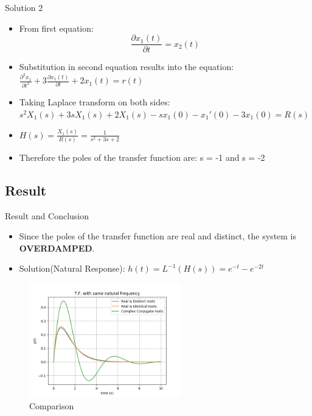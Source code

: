 \documentclass{beamer}
\begin{document}
\begin{frame}{Solution 2}
\begin{block}


\begin{itemize}
\item From first equation: $$\frac{\partial x_1(t)}{\partial t} =              x_2(t) $$
\item Substitution in second equation results into the equation:\vspace{5} $\frac{\partial^2 x_1}{\partial t^2} + 3\frac{\partial x_1(t)}{\partial t} + 2x_1(t) = r(t)$ 
\item Taking Laplace transform on both sides:\vspace{5}
$s^2X_1(s) + 3sX_1(s) + 2X_1(s) - sx_1(0) - x_1'(0) -3x_1(0)  = R(s)$
\item $ H(s) = \frac{X_1(s)}{R(s)} = \frac{1}{s^2 + 3s + 2}$
\item Therefore the poles of the transfer function are: s = -1 and s = -2
\end{itemize}
\end{block}

\end{frame}

\subsection{Result}

\begin{frame}{Result and Conclusion}

\begin{itemize}
    \item Since the poles of the transfer function are real and distinct, the system is \textbf{OVERDAMPED}.
    \item Solution(Natural Response): $h(t) = L^{-1}(H(s)) = e^{-t} - e^{-2t}$
    
\end{itemize}

\begin{figure}
\includegraphics[width=250]{test.png}
\caption{\label{fig:test.png}Comparison}
\end{figure}

\end{frame}
\end{document}
